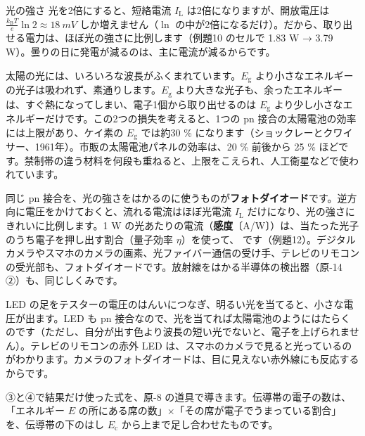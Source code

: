 \begin{phbaisuru}{光の強さ}
光を2倍にすると、短絡電流 $I_{\mathrm L}$ は2倍になりますが、開放電圧は $\frac{k_{\mathrm B}T}{e}\ln2\approx\qty{18}{mV}$ しか増えません（$\ln$ の中が2倍になるだけ）。だから、取り出せる電力は、ほぼ光の強さに比例します（例題10 のセルで 1.83 W → 3.79 W）。曇りの日に発電が減るのは、主に電流が減るからです。
\end{phbaisuru}

太陽の光には、いろいろな波長がふくまれています。$E_{\mathrm g}$ より小さなエネルギーの光子は吸われず、素通りします。$E_{\mathrm g}$ より大きな光子も、余ったエネルギーは、すぐ熱になってしまい、電子1個から取り出せるのは $E_{\mathrm g}$ より少し小さなエネルギーだけです。この2つの損失を考えると、1つの pn 接合の太陽電池の効率には上限があり、ケイ素の $E_{\mathrm g}$ では約30 \% になります（ショックレーとクワイサー、1961年）。市販の太陽電池パネルの効率は、20 \% 前後から 25 \% ほどです。禁制帯の違う材料を何段も重ねると、上限をこえられ、人工衛星などで使われています。

同じ pn 接合を、光の強さをはかるのに使うものが\textbf{フォトダイオード}です。逆方向に電圧をかけておくと、流れる電流はほぼ光電流 $I_{\mathrm L}$ だけになり、光の強さにきれいに比例します。1 W の光あたりの電流（\textbf{感度}〔A/W〕）は、当たった光子のうち電子を押し出す割合（量子効率 $\eta$）を使って、
\label{ph:原-9:resp}です（例題12）。デジタルカメラやスマホのカメラの画素、光ファイバー通信の受け手、テレビのリモコンの受光部も、フォトダイオードです。放射線をはかる半導体の検出器（原-14 ②）も、同じしくみです。

\begin{phmijika}
LED の足をテスターの電圧のはんいにつなぎ、明るい光を当てると、小さな電圧が出ます。LED も pn 接合なので、光を当てれば太陽電池のようにはたらくのです（ただし、自分が出す色より波長の短い光でないと、電子を上げられません）。テレビのリモコンの赤外 LED は、スマホのカメラで見ると光っているのがわかります。カメラのフォトダイオードは、目に見えない赤外線にも反応するからです。
\end{phmijika}

\phkokomade


\label{ph:原-9:sec11}
③と④で結果だけ使った式を、原-8 の道具で導きます。伝導帯の電子の数は、「エネルギー $E$ の所にある席の数」×「その席が電子でうまっている割合」を、伝導帯の下のはし $E_{\mathrm c}$ から上まで足し合わせたものです。

